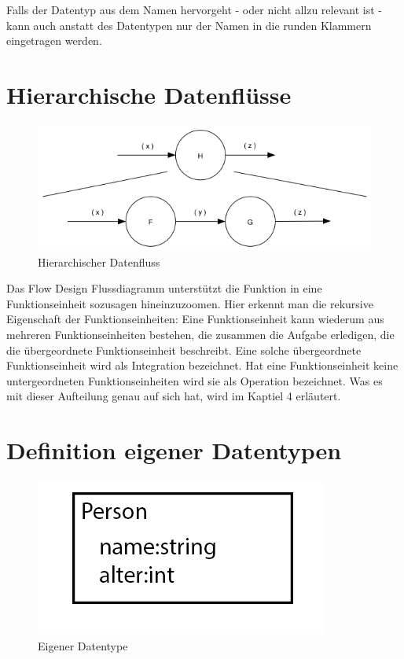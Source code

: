 Falls der Datentyp aus dem Namen hervorgeht - oder nicht allzu relevant ist - kann auch anstatt des Datentypen nur der Namen in die runden Klammern eingetragen werden.


\clearpage

\section{Hierarchische Datenflüsse}



\begin{figure}[H]
	\centering
	\includegraphics[width=1\linewidth]{./img/diagramHir.png}
	\caption{Hierarchischer Datenfluss}
\end{figure}


Das Flow Design Flussdiagramm unterstützt die Funktion in eine Funktionseinheit sozusagen hineinzuzoomen.
Hier erkennt man die rekursive Eigenschaft der Funktionseinheiten:
Eine Funktionseinheit kann wiederum aus mehreren Funktionseinheiten bestehen,
die zusammen die Aufgabe erledigen, die die übergeordnete Funktionseinheit
beschreibt. Eine solche übergeordnete Funktionseinheit wird als Integration
bezeichnet. Hat eine Funktionseinheit keine untergeordneten Funktionseinheiten wird sie
als Operation bezeichnet. Was es mit dieser Aufteilung genau auf sich hat, wird im
Kaptiel 4 erläutert.


\section{Definition eigener Datentypen}






\begin{figure}[H]
	\centering
	\includegraphics[width=.35\linewidth]{./img/diagramCustomTypes.png}
	\caption{Eigener Datentype}
\end{figure}


